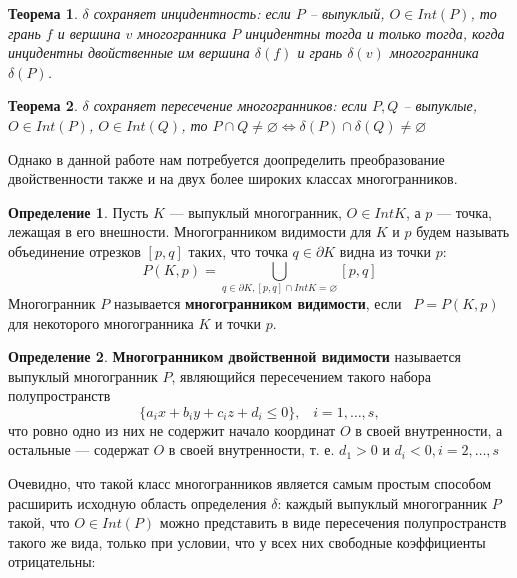 \documentclass[a4paper, 10pt]{article}
\theoremstyle{definition}
\newtheorem{SmartDefinition}{Определение}
\theoremstyle{plain}
\newtheorem{SmartTheorem}{Теорема}
\theoremstyle{plain}
\begin{document}
\begin{SmartTheorem}
\label{theorem:incidence-saving}
 $\delta$ сохраняет инцидентность: если $P$ -- выпуклый, $O \in Int(P)$, то
 грань $f$ и вершина $v$ многогранника $P$ инцидентны тогда и только тогда,
 когда инцидентны двойственные им вершина $\delta(f)$ и грань $\delta(v)$
 многогранника $\delta(P)$.
\end{SmartTheorem}

\begin{SmartTheorem}
\label{theorem:intersection-saving}
 $\delta$ сохраняет пересечение многогранников: если $P, Q$ -- выпуклые,
 $O \in Int(P)$, $O \in Int(Q)$, то
 $P \cap Q \neq \varnothing \Leftrightarrow
 \delta(P) \cap \delta(Q) \neq \varnothing$
\end{SmartTheorem}

Однако в данной работе нам потребуется доопределить преобразование
двойственности также и на двух более широких классах многогранников.

\begin{SmartDefinition}
 Пусть $K$ --- выпуклый многогранник, $O \in Int K$, а $p$ --- точка, лежащая в
 его внешности. Многогранником видимости для $K$ и $p$ будем называть
 объединение отрезков $[p, q]$ таких, что точка $q \in \partial K$ видна из
 точки $p$:
 \begin{equation}
  P(K, p) = \bigcup \limits_{q \in \partial K, [p, q] \cap Int K = \varnothing}
  [p, q]
 \end{equation}
Многогранник $P$ называется \textbf{многогранником видимости}, если \
$P = P(K, p)$ для некоторого многогранника $K$ и точки $p$.
\end{SmartDefinition}

\begin{SmartDefinition}
 \textbf{Многогранником двойственной видимости} называется выпуклый
 многогранник $P$, являющийся пересечением такого набора полупространств
 \begin{equation}
 \label{equation:halfspace}
  \{a_{i} x + b_{i} y + c_{i} z + d_{i} \leq 0 \}, \;\;\; i = 1, \ldots, s,
 \end{equation}
 что ровно одно из них не содержит начало координат $O$ в своей внутренности, а
 остальные --- содержат $O$ в своей внутренности, т. е. $d_{1} > 0$ и
 $d_{i} < 0, i = 2, \ldots, s$
\end{SmartDefinition}

Очевидно, что такой класс многогранников является самым простым способом
расширить исходную область определения $\delta$: каждый выпуклый многогранник
$P$ такой, что $O \in Int(P)$ можно представить в виде пересечения
полупространств такого же вида, только при условии, что у всех них свободные
коэффициенты отрицательны:
\end{document}
